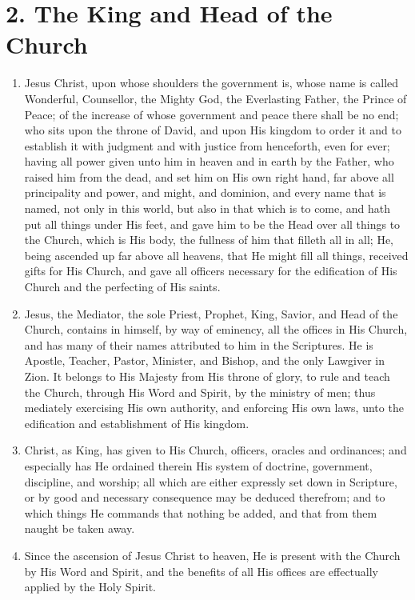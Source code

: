 \documentclass[
]{book}
\providecommand{\tightlist}{%
  \setlength{\itemsep}{0pt}\setlength{\parskip}{0pt}}
\begin{document}
\hypertarget{the-king-and-head-of-the-church}{%
\section*{2. The King and Head of the Church}\label{the-king-and-head-of-the-church}}

\protect\hypertarget{chapter-slug-2-the-king-and-head-of-the-church}{\href{}{}}

\begin{enumerate}
\def\labelenumi{\arabic{enumi}.}
\tightlist
\item
  \protect\hypertarget{2}{\href{}{}}Jesus Christ, upon whose shoulders the government is, whose name is called Wonderful, Counsellor, the Mighty God, the Everlasting Father, the Prince of Peace; of the increase of whose government and peace there shall be no end; who sits upon the throne of David, and upon His kingdom to order it and to establish it with judgment and with justice from henceforth, even for ever; having all power given unto him in heaven and in earth by the Father, who raised him from the dead, and set him on His own right hand, far above all principality and power, and might, and dominion, and every name that is named, not only in this world, but also in that which is to come, and hath put all things under His feet, and gave him to be the Head over all things to the Church, which is His body, the fullness of him that filleth all in all; He, being ascended up far above all heavens, that He might fill all things, received gifts for His Church, and gave all officers necessary for the edification of His Church and the perfecting of His saints.
\item
  Jesus, the Mediator, the sole Priest, Prophet, King, Savior, and Head of the Church, contains in himself, by way of eminency, all the offices in His Church, and has many of their names attributed to him in the Scriptures. He is Apostle, Teacher, Pastor, Minister, and Bishop, and the only Lawgiver in Zion. It belongs to His Majesty from His throne of glory, to rule and teach the Church, through His Word and Spirit, by the ministry of men; thus mediately exercising His own authority, and enforcing His own laws, unto the edification and establishment of His kingdom.
\item
  Christ, as King, has given to His Church, officers, oracles and ordinances; and especially has He ordained therein His system of doctrine, government, discipline, and worship; all which are either expressly set down in Scripture, or by good and necessary consequence may be deduced therefrom; and to which things He commands that nothing be added, and that from them naught be taken away.
\item
  Since the ascension of Jesus Christ to heaven, He is present with the Church by His Word and Spirit, and the benefits of all His offices are effectually applied by the Holy Spirit.
\end{enumerate}
\end{document}
